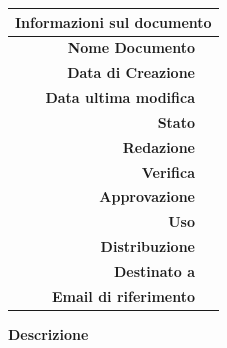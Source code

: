 \begin{center}
\begin{center}
\begin{tabular}{r|l}
	\multicolumn{2}{c}{\textbf{Informazioni sul documento} } \\ \hline
	\textbf{Nome Documento} & \nomedocumentofisico \\
	\textbf{Data di Creazione} & \datacreazione \\
	\textbf{Data ultima modifica} & \datamodifica \\
	\textbf{Stato} & \stato \\
	\textbf{Redazione} & \redazione \\
	\textbf{Verifica} & \verifica \\
	\textbf{Approvazione} & \approvazione \\
	\textbf{Uso} & \uso \\
	\textbf{Distribuzione} & \gruppo \\
	\textbf{Destinato a} & \destinateTo \\
	\textbf{Email di riferimento} & \email
\end{tabular}
\end{center}

\normalsize

\textbf{Descrizione} \\


\end{center}

\clearpage